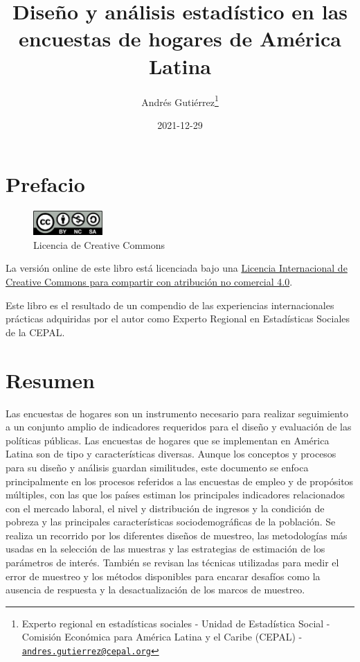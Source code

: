 \documentclass[
  12pt,
  spanish,
]{book}
\title{Diseño y análisis estadístico en las encuestas de hogares de América Latina}
\author{Andrés Gutiérrez\footnote{Experto regional en estadísticas sociales - Unidad de Estadística Social - Comisión Económica para América Latina y el Caribe (CEPAL) - \href{mailto:andres.gutierrez@cepal.org}{\nolinkurl{andres.gutierrez@cepal.org}}}}
\date{2021-12-29}
\begin{document}
\maketitle

{
\hypersetup{linkcolor=}
\setcounter{tocdepth}{1}
\tableofcontents
}
\listoftables
\listoffigures
\hypertarget{prefacio}{%
\chapter*{Prefacio}\label{prefacio}}

\begin{figure}
\includegraphics[width=100px]{Pics/CClicence} \caption{Licencia de Creative Commons}\label{fig:unnamed-chunk-1}
\end{figure}

La versión online de este libro está licenciada bajo una \href{http://creativecommons.org/licenses/by-nc-sa/4.0/}{Licencia Internacional de Creative Commons para compartir con atribución no comercial 4.0}.

Este libro es el resultado de un compendio de las experiencias internacionales prácticas adquiridas por el autor como Experto Regional en Estadísticas Sociales de la CEPAL.

\hypertarget{resumen}{%
\chapter*{Resumen}\label{resumen}}

Las encuestas de hogares son un instrumento necesario para realizar seguimiento a un conjunto amplio de indicadores requeridos para el diseño y evaluación de las políticas públicas. Las encuestas de hogares que se implementan en América Latina son de tipo y características diversas. Aunque los conceptos y procesos para su diseño y análisis guardan similitudes, este documento se enfoca principalmente en los procesos referidos a las encuestas de empleo y de propósitos múltiples, con las que los países estiman los principales indicadores relacionados con el mercado laboral, el nivel y distribución de ingresos y la condición de pobreza y las principales características sociodemográficas de la población. Se realiza un recorrido por los diferentes diseños de muestreo, las metodologías más usadas en la selección de las muestras y las estrategias de estimación de los parámetros de interés. También se revisan las técnicas utilizadas para medir el error de muestreo y los métodos disponibles para encarar desafíos como la ausencia de respuesta y la desactualización de los marcos de muestreo.
\end{document}
